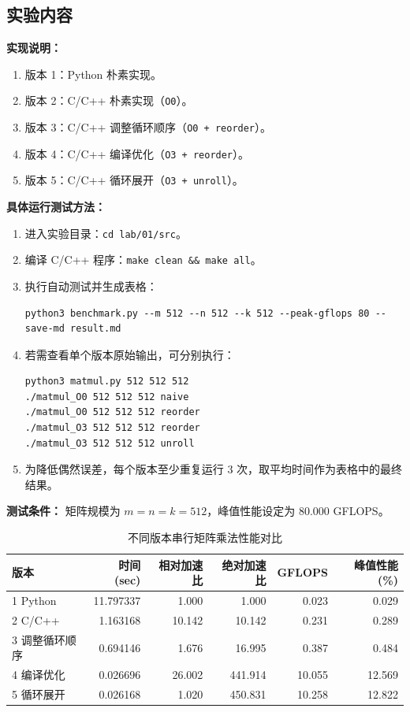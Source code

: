 \documentclass[12pt,a4paper]{ctexart}
\begin{document}
\subsection{实验内容}
\textbf{实现说明：}
\begin{enumerate}
  \item 版本 1：Python 朴素实现。
  \item 版本 2：C/C++ 朴素实现（\texttt{O0}）。
  \item 版本 3：C/C++ 调整循环顺序（\texttt{O0 + reorder}）。
  \item 版本 4：C/C++ 编译优化（\texttt{O3 + reorder}）。
  \item 版本 5：C/C++ 循环展开（\texttt{O3 + unroll}）。
\end{enumerate}

\textbf{具体运行测试方法：}
\begin{enumerate}
  \item 进入实验目录：\texttt{cd lab/01/src}。
  \item 编译 C/C++ 程序：\texttt{make clean \&\& make all}。
  \item 执行自动测试并生成表格：
\begin{verbatim}
python3 benchmark.py --m 512 --n 512 --k 512 --peak-gflops 80 --save-md result.md
\end{verbatim}
  \item 若需查看单个版本原始输出，可分别执行：
\begin{verbatim}
python3 matmul.py 512 512 512
./matmul_O0 512 512 512 naive
./matmul_O0 512 512 512 reorder
./matmul_O3 512 512 512 reorder
./matmul_O3 512 512 512 unroll
\end{verbatim}
  \item 为降低偶然误差，每个版本至少重复运行 3 次，取平均时间作为表格中的最终结果。
\end{enumerate}

\textbf{测试条件：}
矩阵规模为 $m=n=k=512$，峰值性能设定为 $80.000$ GFLOPS。

\begin{table}[htbp]
\centering
\caption{不同版本串行矩阵乘法性能对比}
\begin{tabular}{lrrrrr}
\toprule
版本 & 时间(sec) & 相对加速比 & 绝对加速比 & GFLOPS & 峰值性能(\%) \\
\midrule
1 Python                & 11.797337 & 1.000  & 1.000   & 0.023  & 0.029  \\
2 C/C++                 & 1.163168  & 10.142 & 10.142  & 0.231  & 0.289  \\
3 调整循环顺序          & 0.694146  & 1.676  & 16.995  & 0.387  & 0.484  \\
4 编译优化              & 0.026696  & 26.002 & 441.914 & 10.055 & 12.569 \\
5 循环展开              & 0.026168  & 1.020  & 450.831 & 10.258 & 12.822 \\
\bottomrule
\end{tabular}
\end{table}
\end{document}
